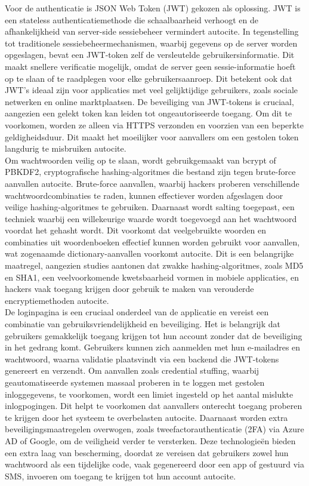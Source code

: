 Voor de authenticatie is JSON Web Token (JWT) gekozen als oplossing. JWT is een stateless authenticatiemethode die schaalbaarheid verhoogt en de afhankelijkheid van server-side sessiebeheer vermindert autocite{}. In tegenstelling tot traditionele sessiebeheermechanismen, waarbij gegevens op de server worden opgeslagen, bevat een JWT-token zelf de versleutelde gebruikersinformatie. Dit maakt snellere verificatie mogelijk, omdat de server geen sessie-informatie hoeft op te slaan of te raadplegen voor elke gebruikersaanroep. Dit betekent ook dat JWT’s ideaal zijn voor applicaties met veel gelijktijdige gebruikers, zoals sociale netwerken en online marktplaatsen. De beveiliging van JWT-tokens is cruciaal, aangezien een gelekt token kan leiden tot ongeautoriseerde toegang. Om dit te voorkomen, worden ze alleen via HTTPS verzonden en voorzien van een beperkte geldigheidsduur. Dit maakt het moeilijker voor aanvallers om een gestolen token langdurig te misbruiken autocite{}. \\

Om wachtwoorden veilig op te slaan, wordt gebruikgemaakt van bcrypt of PBKDF2, cryptografische hashing-algoritmes die bestand zijn tegen brute-force aanvallen autocite{}. Brute-force aanvallen, waarbij hackers proberen verschillende wachtwoordcombinaties te raden, kunnen effectiever worden afgeslagen door veilige hashing-algoritmes te gebruiken. Daarnaast wordt salting toegepast, een techniek waarbij een willekeurige waarde wordt toegevoegd aan het wachtwoord voordat het gehasht wordt. Dit voorkomt dat veelgebruikte woorden en combinaties uit woordenboeken effectief kunnen worden gebruikt voor aanvallen, wat zogenaamde dictionary-aanvallen voorkomt autocite{}. Dit is een belangrijke maatregel, aangezien studies aantonen dat zwakke hashing-algoritmes, zoals MD5 en SHA1, een veelvoorkomende kwetsbaarheid vormen in mobiele applicaties, en hackers vaak toegang krijgen door gebruik te maken van verouderde encryptiemethoden autocite{}. \\

De loginpagina is een cruciaal onderdeel van de applicatie en vereist een combinatie van gebruiksvriendelijkheid en beveiliging. Het is belangrijk dat gebruikers gemakkelijk toegang krijgen tot hun account zonder dat de beveiliging in het gedrang komt. Gebruikers kunnen zich aanmelden met hun e-mailadres en wachtwoord, waarna validatie plaatsvindt via een backend die JWT-tokens genereert en verzendt. Om aanvallen zoals credential stuffing, waarbij geautomatiseerde systemen massaal proberen in te loggen met gestolen inloggegevens, te voorkomen, wordt een limiet ingesteld op het aantal mislukte inlogpogingen. Dit helpt te voorkomen dat aanvallers onterecht toegang proberen te krijgen door het systeem te overbelasten autocite{}. Daarnaast worden extra beveiligingsmaatregelen overwogen, zoals tweefactorauthenticatie (2FA) via Azure AD of Google, om de veiligheid verder te versterken. Deze technologieën bieden een extra laag van bescherming, doordat ze vereisen dat gebruikers zowel hun wachtwoord als een tijdelijke code, vaak gegenereerd door een app of gestuurd via SMS, invoeren om toegang te krijgen tot hun account autocite{}. 

